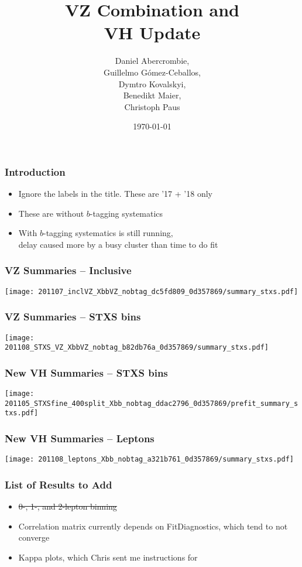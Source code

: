 \documentclass{beamer}
\author[D. Abercrombie]{
  Daniel Abercrombie, \\
  Guillelmo G\'omez-Ceballos, \\
  Dymtro Kovalskyi, \\
  Benedikt Maier, \\
  Christoph Paus
}
\title{\bf \sffamily VZ Combination and \\ VH Update}
\date{\today}
\newcommand{\beginbackup}{
  \newcounter{framenumbervorappendix}
  \setcounter{framenumbervorappendix}{\value{framenumber}}
}
\newcommand{\backupend}{
  \addtocounter{framenumbervorappendix}{-\value{framenumber}}
  \addtocounter{framenumber}{\value{framenumbervorappendix}}
}
\begin{document}
\begin{frame}
  \titlepage
\end{frame}

\begin{frame}
  \frametitle{Introduction}

  \begin{itemize}
  \item Ignore the labels in the title. These are '17 + '18 only
  \item These are without $b$-tagging systematics
  \item With $b$-tagging systematics is still running, \\
    delay caused more by a busy cluster than time to do fit
  \end{itemize}
\end{frame}

\begin{frame}
  \frametitle{VZ Summaries -- Inclusive}

  \centering
  \texttt{[image: 201107\_inclVZ\_XbbVZ\_nobtag\_dc5fd809\_0d357869/summary\_stxs.pdf]}

\end{frame}

\begin{frame}
  \frametitle{VZ Summaries -- STXS bins}

  \centering
  \texttt{[image: 201108\_STXS\_VZ\_XbbVZ\_nobtag\_b82db76a\_0d357869/summary\_stxs.pdf]}

\end{frame}

\begin{frame}
  \frametitle{New VH Summaries -- STXS bins}

  \centering
  \texttt{[image: 201105\_STXSfine\_400split\_Xbb\_nobtag\_ddac2796\_0d357869/prefit\_summary\_stxs.pdf]}

\end{frame}

\begin{frame}
  \frametitle{New VH Summaries -- Leptons}

  \centering
  \texttt{[image: 201108\_leptons\_Xbb\_nobtag\_a321b761\_0d357869/summary\_stxs.pdf]}

\end{frame}

\begin{frame}
  \frametitle{List of Results to Add}

  \begin{itemize}
  \item \sout{0-, 1-, and 2-lepton binning}
  \item Correlation matrix currently depends on FitDiagnostics,
    which tend to not converge
  \item Kappa plots, which Chris sent me instructions for
  \end{itemize}

\end{frame}

\begin{comment}
\beginbackup

\begin{frame}
  \centering
    {\Huge \bf\sffamily Backup Slides}
\end{frame}



\backupend
\end{comment}
\end{document}
